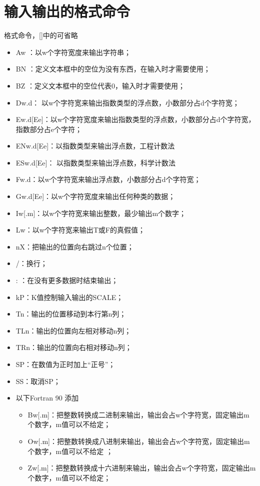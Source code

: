\section{输入输出的格式命令}
格式命令，[]中的可省略  
\begin{itemize}
\item Aw ：以w个字符宽度来输出字符串；
\item BN ：定义文本框中的空位为没有东西，在输入时才需要使用；  
\item BZ ：定义文本框中的空位代表0，输入时才需要使用； 
\item Dw.d： 以w个字符宽来输出指数类型的浮点数，小数部分占d个字符宽；  
\item Ew.d[Ee]：以w个字符宽度来输出指数类型的浮点数，小数部分占d个字符宽，指数部分占e个字符；  
\item ENw.d[Ee]：以指数类型来输出浮点数，工程计数法  
\item ESw.d[Ee]： 以指数类型来输出浮点数，科学计数法  
\item Fw.d：以w个字符宽来输出浮点数，小数部分占d个字符宽；  
\item Gw.d[Ee]：以w个字符宽度来输出任何种类的数据；  
\item Iw[.m]：以w个字符宽来输出整数，最少输出m个数字；  
\item Lw：以w个字符宽来输出T或F的真假值；  
\item nX：把输出的位置向右跳过n个位置；  
\item /：换行；  
\item :  ：在没有更多数据时结束输出；  
\item kP：K值控制输入输出的SCALE；  
\item Tn：输出的位置移动到本行第n列；  
\item TLn：输出的位置向左相对移动n列；  
\item TRn：输出的位置向右相对移动n列；  
\item SP：在数值为正时加上“正号”；  
\item SS：取消SP；  
\item 以下Fortran 90 添加
	\begin{itemize}
	\item Bw[.m]：把整数转换成二进制来输出，输出会占w个字符宽，固定输出m个数字，m值可以不给定；  
	\item Ow[.m]：把整数转换成八进制来输出，输出会占w个字符宽，固定输出m个数字，m值可以不给定 ； 
	\item Zw[.m]：把整数转换成十六进制来输出，输出会占w个字符宽，固定输出m个数字，m值可以不给定；
	\end{itemize}
\end{itemize}




